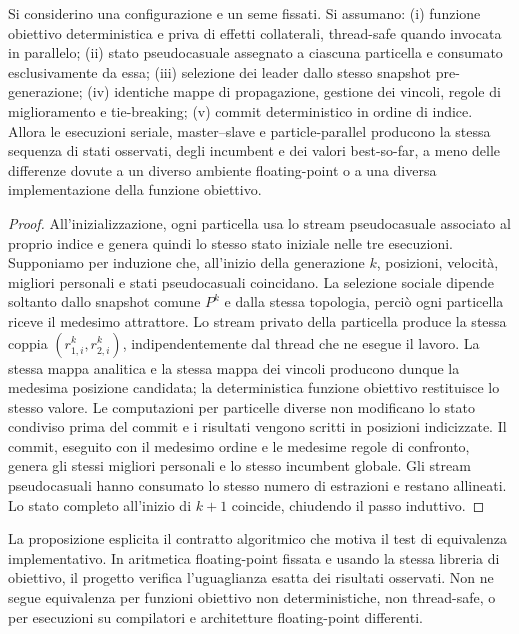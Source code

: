 \begin{proposition}
\label{prop:synchronous-equivalence}
Si considerino una configurazione e un seme fissati. Si assumano: (i) funzione obiettivo deterministica e priva di effetti collaterali, thread-safe quando invocata in parallelo; (ii) stato pseudocasuale assegnato a ciascuna particella e consumato esclusivamente da essa; (iii) selezione dei leader dallo stesso snapshot pre-generazione; (iv) identiche mappe di propagazione, gestione dei vincoli, regole di miglioramento e tie-breaking; (v) commit deterministico in ordine di indice. Allora le esecuzioni seriale, master--slave e particle-parallel producono la stessa sequenza di stati osservati, degli incumbent e dei valori best-so-far, a meno delle differenze dovute a un diverso ambiente floating-point o a una diversa implementazione della funzione obiettivo.
\end{proposition}

\begin{proof}
All'inizializzazione, ogni particella usa lo stream pseudocasuale associato al proprio indice e genera quindi lo stesso stato iniziale nelle tre esecuzioni. Supponiamo per induzione che, all'inizio della generazione $k$, posizioni, velocità, migliori personali e stati pseudocasuali coincidano. La selezione sociale dipende soltanto dallo snapshot comune $P^k$ e dalla stessa topologia, perciò ogni particella riceve il medesimo attrattore. Lo stream privato della particella produce la stessa coppia $(r_{1,i}^k,r_{2,i}^k)$, indipendentemente dal thread che ne esegue il lavoro. La stessa mappa analitica e la stessa mappa dei vincoli producono dunque la medesima posizione candidata; la deterministica funzione obiettivo restituisce lo stesso valore. Le computazioni per particelle diverse non modificano lo stato condiviso prima del commit e i risultati vengono scritti in posizioni indicizzate. Il commit, eseguito con il medesimo ordine e le medesime regole di confronto, genera gli stessi migliori personali e lo stesso incumbent globale. Gli stream pseudocasuali hanno consumato lo stesso numero di estrazioni e restano allineati. Lo stato completo all'inizio di $k+1$ coincide, chiudendo il passo induttivo.
\end{proof}

La proposizione esplicita il contratto algoritmico che motiva il test di equivalenza implementativo. In aritmetica floating-point fissata e usando la stessa libreria di obiettivo, il progetto verifica l'uguaglianza esatta dei risultati osservati. Non ne segue equivalenza per funzioni obiettivo non deterministiche, non thread-safe, o per esecuzioni su compilatori e architetture floating-point differenti.

